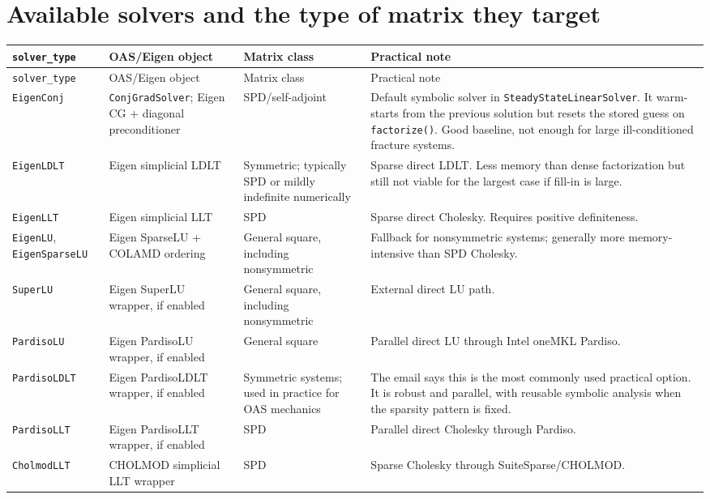 \documentclass[10pt,a4paper]{article}
\newcommand{\code}[1]{\texttt{#1}}
\begin{document}
\section{Available solvers and the type of matrix they target}

\small
\begin{longtable}{L{0.18\textwidth} L{0.25\textwidth} L{0.18\textwidth} L{0.29\textwidth}}
\toprule
\code{solver\_type} & OAS/Eigen object & Matrix class & Practical note \\
\midrule
\endfirsthead
\toprule
\code{solver\_type} & OAS/Eigen object & Matrix class & Practical note \\
\midrule
\endhead
\bottomrule
\endfoot
\code{EigenConj} & \code{ConjGradSolver}; Eigen CG + diagonal preconditioner & SPD/self-adjoint & Default symbolic solver in \code{SteadyStateLinearSolver}. It warm-starts from the previous solution but resets the stored guess on \code{factorize()}. Good baseline, not enough for large ill-conditioned fracture systems. \\
\code{EigenLDLT} & Eigen simplicial LDLT & Symmetric; typically SPD or mildly indefinite numerically & Sparse direct LDLT. Less memory than dense factorization but still not viable for the largest case if fill-in is large. \\
\code{EigenLLT} & Eigen simplicial LLT & SPD & Sparse direct Cholesky. Requires positive definiteness. \\
\code{EigenLU}, \code{EigenSparseLU} & Eigen SparseLU + COLAMD ordering & General square, including nonsymmetric & Fallback for nonsymmetric systems; generally more memory-intensive than SPD Cholesky. \\
\code{SuperLU} & Eigen SuperLU wrapper, if enabled & General square, including nonsymmetric & External direct LU path. \\
\code{PardisoLU} & Eigen PardisoLU wrapper, if enabled & General square & Parallel direct LU through Intel oneMKL Pardiso. \\
\code{PardisoLDLT} & Eigen PardisoLDLT wrapper, if enabled & Symmetric systems; used in practice for OAS mechanics & The email says this is the most commonly used practical option. It is robust and parallel, with reusable symbolic analysis when the sparsity pattern is fixed. \\
\code{PardisoLLT} & Eigen PardisoLLT wrapper, if enabled & SPD & Parallel direct Cholesky through Pardiso. \\
\code{CholmodLLT} & CHOLMOD simplicial LLT wrapper & SPD & Sparse Cholesky through SuiteSparse/CHOLMOD. \\

\end{longtable}
\end{document}
